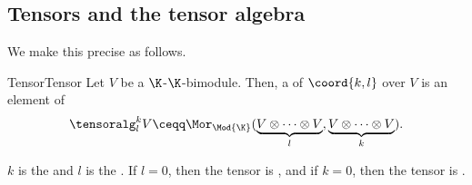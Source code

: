 \subsection{Tensors and the tensor algebra}

We make this precise as follows.
\begin{dfn}{Tensor}{Tensor}
	Let $V$ be a $\K$-$\K$-bimodule.  Then, a  of  $\coord{k,l}$ over $V$ is an element of
	\begin{equation}\label{eqn5.4.2}
		\tensoralg _l^kV\ceqq \Mor _{\Mod{\K}}(\underbrace{V\otimes \cdots \otimes V}_l,\underbrace{V\otimes \cdots \otimes V}_k).
	\end{equation}
	\begin{rmk}
		$k$ is the  and $l$ is the .  If $l=0$, then the tensor is , and if $k=0$, then the tensor is .
		

\end{rmk}
\end{dfn}
